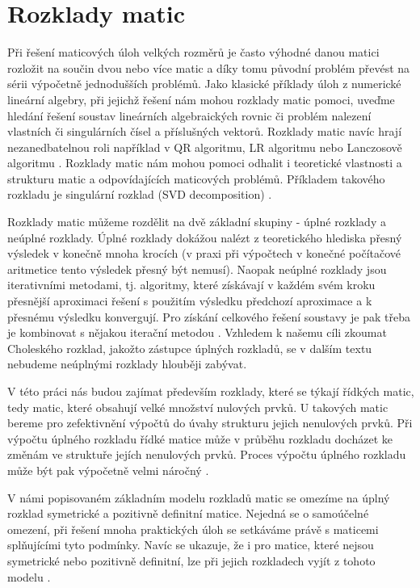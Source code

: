 \documentclass{ctuthesis}
\theoremstyle{plain}
\theoremstyle{definition}
\begin{document}

\chapter{Rozklady matic}

Při řešení maticových úloh velkých rozměrů je často výhodné danou matici rozložit na součin dvou nebo více matic a díky tomu původní problém převést na sérii výpočetně jednodušších problémů. Jako klasické příklady úloh z numerické lineární algebry, při jejichž řešení nám mohou rozklady matic pomoci, uveďme hledání řešení soustav lineárních algebraických rovnic či problém nalezení vlastních či singulárních čísel a příslušných vektorů. Rozklady matic navíc hrají nezanedbatelnou roli například v QR algoritmu, LR algoritmu \cite{govl:83} nebo Lanczosově algoritmu \cite{lanc:50,paig:72}. Rozklady matic nám mohou pomoci odhalit i teoretické vlastnosti a strukturu matic a odpovídajících maticových problémů. Příkladem takového rozkladu je singulární rozklad (SVD decomposition) \cite{govl:83}.

Rozklady matic můžeme rozdělit na dvě základní skupiny - úplné rozklady a neúplné rozklady. Úplné rozklady dokážou nalézt z teoretického hlediska přesný výsledek v konečně mnoha krocích (v praxi při výpočtech v konečné počítačové aritmetice tento výsledek přesný být nemusí). Naopak neúplné rozklady jsou iterativními metodami, tj. algoritmy, které získávají v každém svém kroku přesnější aproximaci řešení s použitím výsledku předchozí aproximace a k přesnému výsledku konvergují. Pro získání celkového řešení soustavy je pak třeba je kombinovat s nějakou iterační metodou \cite{temp94}. Vzhledem k našemu cíli zkoumat Choleského rozklad, jakožto zástupce úplných rozkladů, se v dalším textu nebudeme neúplnými rozklady hlouběji zabývat. 

V této práci nás budou zajímat především rozklady, které se týkají řídkých matic, tedy matic, které obsahují velké množství nulových prvků. U takových matic bereme pro zefektivnění výpočtů do úvahy strukturu jejich nenulových prvků. Při výpočtu úplného rozkladu řídké matice může v průběhu rozkladu docházet ke změnám ve struktuře jejích nenulových prvků. Proces výpočtu úplného rozkladu může být pak výpočetně velmi náročný \cite{duiare:86}.

V námi popisovaném základním modelu rozkladů matic se omezíme na úplný rozklad symetrické a pozitivně definitní matice. Nejedná se o samoúčelné omezení, při řešení mnoha praktických úloh se setkáváme právě s maticemi splňujícími tyto podmínky. Navíc se ukazuje, že i pro matice, které nejsou symetrické nebo pozitivně definitní, lze při jejich rozkladech vyjít z tohoto modelu \cite{dara:16}.
\end{document}
